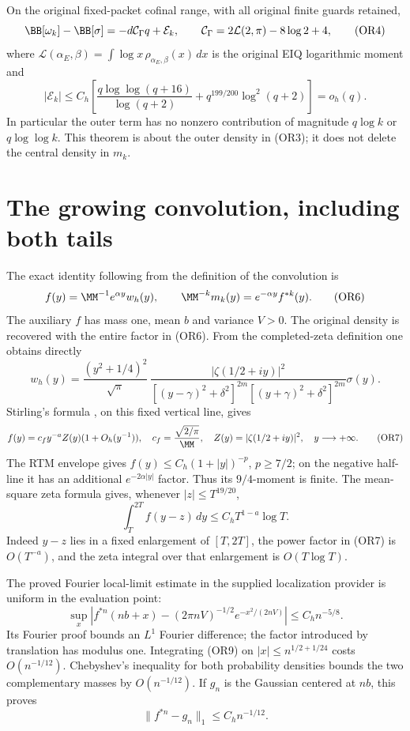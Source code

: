 \begin{theorem}
On the original fixed-packet cofinal range, with all original finite
guards retained,
\[
 \BB[\omega_k]-\BB[\sigma]
 =-d\mathcal C_\Gamma q+\mathcal E_k,\qquad
 \mathcal C_\Gamma=2\mathcal L(2,\pi)-8\log2+4,          \tag{OR4}
\]
where \(\mathcal L(\alpha_E,\beta)=\int\log x\,\rho_{\alpha_E,\beta}(x)\,dx\)
is the original EIQ logarithmic moment and
\[
 |\mathcal E_k|\leq C_h\left[
 \frac{q\log\log(q+16)}{\log(q+2)}
 +q^{199/200}\log^2(q+2)\right]=o_h(q).                \tag{OR5}
\]
In particular the outer term has no nonzero contribution of magnitude
\(q\log k\) or \(q\log\log k\).  This theorem is about the outer density
in (OR3); it does not delete the central density in \(m_k\).
\end{theorem}

\section{The growing convolution, including both tails}
The exact identity following from the definition of the convolution is
\[
 f(y)=\MM^{-1}e^{\alpha y}w_h(y),\qquad
 \MM^{-k}m_k(y)=e^{-\alpha y}f^{*k}(y).                \tag{OR6}
\]
The auxiliary \(f\) has mass one, mean \(b\) and variance \(V>0\).
The original density is recovered with the entire factor in (OR6).
From the completed-zeta definition one obtains directly
\[
 w_h(y)=\frac{(y^2+1/4)^2}{\sqrt\pi}\,
 \frac{|\zeta(1/2+iy)|^2}
 {[(y-\gamma)^2+\delta^2]^{2m}[(y+\gamma)^2+\delta^2]^{2m}}\sigma(y).
\]
Stirling's formula \cite{or:DLMFgamma}, on this fixed vertical line, gives
\[
 f(y)=c_fy^{-a}Z(y)(1+O_h(y^{-1})),\quad
 c_f=\frac{\sqrt{2/\pi}}{\MM},\quad
 Z(y)=|\zeta(1/2+iy)|^2,\quad y\longrightarrow+\infty. \tag{OR7}
\]
The RTM envelope gives \(f(y)\leq C_h(1+|y|)^{-p}\), \(p\geq7/2\);
on the negative half-line it has an additional
\(e^{-2\alpha|y|}\) factor.  Thus its \(9/4\)-moment is finite.
The mean-square zeta formula gives, whenever \(|z|\leq T^{19/20}\),
\[
 \int_T^{2T}f(y-z)\,dy\leq C_h T^{1-a}\log T.          \tag{OR8}
\]
Indeed \(y-z\) lies in a fixed enlargement of \([T,2T]\), the power
factor in (OR7) is \(O(T^{-a})\), and the zeta integral over that
enlargement is \(O(T\log T)\).

The proved Fourier local-limit estimate in the supplied localization
provider is uniform in the evaluation point:
\[
 \sup_x\left|f^{*n}(nb+x)
 -(2\pi nV)^{-1/2}e^{-x^2/(2nV)}\right|
 \leq C_h n^{-5/8}.                                  \tag{OR9}
\]
Its Fourier proof bounds an \(L^1\) Fourier difference; the factor
introduced by translation has modulus one.  Integrating (OR9) on
\(|x|\leq n^{1/2+1/24}\) costs \(O(n^{-1/12})\).
Chebyshev's inequality for both probability densities bounds the two
complementary masses by \(O(n^{-1/12})\).  If \(g_n\) is the Gaussian
centered at \(nb\), this proves
\[
 \|f^{*n}-g_n\|_1\leq C_h n^{-1/12}.                  \tag{OR10}
\]

